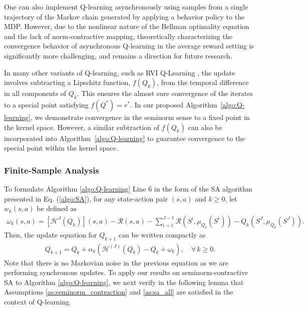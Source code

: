 \documentclass[11 pt]{article}
\begin{document}
	
	One can also implement Q-learning asynchronously using samples from a single trajectory of the Markov chain generated by applying a behavior policy to the MDP. However, due to the nonlinear nature of the Bellman optimality equation and the lack of norm-contractive mapping, theoretically characterizing the convergence behavior of asynchronous Q-learning in the average reward setting is significantly more challenging, and remains a direction for future research.
	
	
	
	
	
	
	
	
	
	
	
	In many other variants of Q-learning, such as RVI Q-Learning \cite{abounadi2001learning}, the update involves subtracting a Lipschitz function, $ f(Q_k) $, from the temporal difference in all components of $ Q_k $. This ensures the almost sure convergence of the iterates to a special point satisfying $ f(Q^*) = r^* $. In our proposed Algorithm~\ref{algo:Q-learning}, we demonstrate convergence in the seminorm sense to a fixed point in the kernel space. However, a similar subtraction of $ f(Q_k) $ can also be incorporated into Algorithm~\ref{algo:Q-learning} to guarantee convergence to the special point within the kernel space. 
	
	
	\subsubsection{Finite-Sample Analysis}
	To formulate Algorithm \ref{algo:Q-learning} Line $6$ in the form of the SA algorithm presented in Eq. (\ref{algo:SA}), for any state-action pair $(s,a)$ and $k\geq 0$, let $w_k(s,a)$ be defined as
	\begin{align*}
		\omega_k(s,a)=[\mathcal{H}^J(Q_k)](s,a)-\mathcal{R}(s,a)-\sum_{i=1}^{J-1}\mathcal{R}(S^i,\mu_{Q_k}(S^i)) - Q_k(S^J, \mu_{Q_k}(S^J)).
	\end{align*}
	Then, the update equation for $Q_{k+1}$ can be written compactly as
	\begin{align}\label{eq:Q_update}
		Q_{k+1}
		=Q_k+\alpha_k(\mathcal{H}^{(J)}(Q_k)-Q_k+\omega_k),\quad\forall\,k\geq 0.
	\end{align}
	Note that there is no Markovian noise in the previous equation as we are performing synchronous updates. To apply our results on seminorm-contractive SA to Algorithm \ref{algo:Q-learning}, we next verify in the following lemma that Assumptions \ref{as:seminorm_contraction} and \ref{as:sa_all} are satisfied in the context of Q-learning.
	
\end{document}
